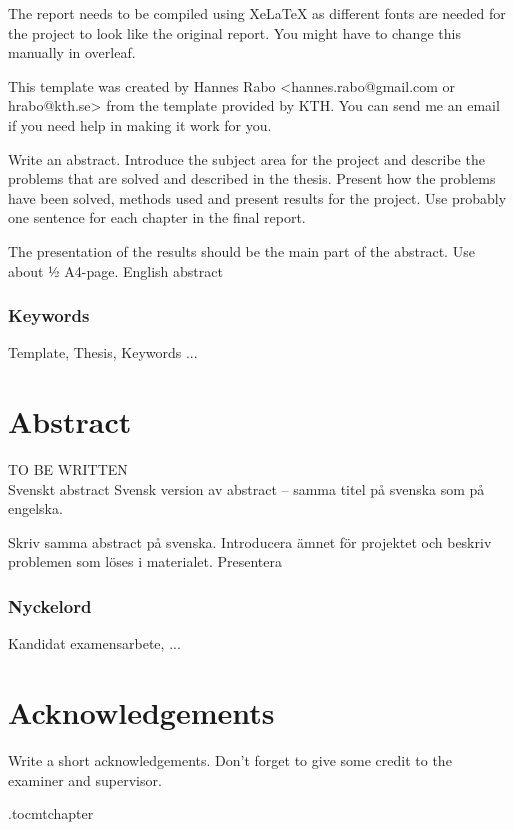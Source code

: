 The report needs to be compiled using XeLaTeX as different fonts are needed for the project to look like the original report. You might have to change this manually in overleaf.

This template was created by Hannes Rabo <hannes.rabo@gmail.com or hrabo@kth.se> from the template provided by KTH. You can send me an email if you need help in making it work for you.


\vspace{2cm}
Write an abstract. Introduce the subject area for the project and describe the problems that are solved and described in the thesis. Present how the problems have been solved, methods used and present results for the project. Use probably one sentence for each chapter in the final report.

The presentation of the results should be the main part of the abstract. Use about ½ A4-page.
English abstract

\subsection*{Keywords}
Template, Thesis, Keywords ...

\newpage
\thispagestyle{plain}
\chapter*{Abstract} 
TO BE WRITTEN\\
Svenskt abstract 
Svensk version av abstract – samma titel på svenska som på engelska.

Skriv samma abstract på svenska. Introducera ämnet för projektet och beskriv problemen som löses i materialet. Presentera 

\subsection*{Nyckelord}
Kandidat examensarbete, ...

\newpage
\thispagestyle{plain}
\chapter*{Acknowledgements}
Write a short acknowledgements. Don't forget to give some credit to the examiner and supervisor.

\newpage



\newpage

\etocdepthtag.toc{mtchapter}
\thispagestyle{plain}
\tableofcontents

\newpage


